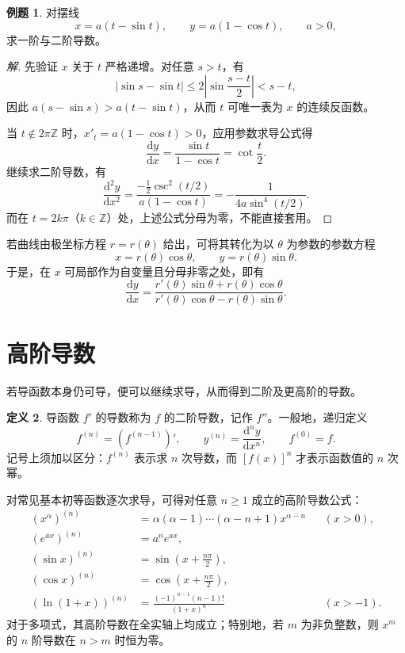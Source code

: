 \documentclass[UTF8,fontset=fandol,a4paper,12pt]{ctexart}
\newcommand{\dd}{\mathrm d}
\theoremstyle{definition}
\newtheorem{definition}{定义}[section]
\newtheorem{example}[definition]{例题}
\begin{document}
\begin{example}
对摆线
\[
 x=a(t-\sin t),\qquad y=a(1-\cos t),\qquad a>0,
\]
求一阶与二阶导数。
\end{example}
\begin{proof}[解]
先验证 $x$ 关于 $t$ 严格递增。对任意 $s>t$，有
\[
 |\sin s-\sin t|\le2\left|\sin\frac{s-t}{2}\right|<s-t,
\]
因此 $a(s-\sin s)>a(t-\sin t)$，从而 $t$ 可唯一表为 $x$ 的连续反函数。

当 $t\notin2\pi\mathbb Z$ 时，$x'_t=a(1-\cos t)>0$，应用参数求导公式得
\[
 \frac{\dd y}{\dd x}=\frac{\sin t}{1-\cos t}=\cot\frac t2.
\]
继续求二阶导数，有
\[
 \frac{\dd^2y}{\dd x^2}
 =\frac{-\frac12\csc^2(t/2)}{a(1-\cos t)}
 =-\frac1{4a\sin^4(t/2)}.
\]
而在 $t=2k\pi$（$k\in\mathbb Z$）处，上述公式分母为零，不能直接套用。
\end{proof}

若曲线由极坐标方程 $r=r(\theta)$ 给出，可将其转化为以 $\theta$ 为参数的参数方程
\[
 x=r(\theta)\cos\theta,\qquad y=r(\theta)\sin\theta.
\]
于是，在 $x$ 可局部作为自变量且分母非零之处，即有
\[
 \frac{\dd y}{\dd x}
 =\frac{r'(\theta)\sin\theta+r(\theta)\cos\theta}
 {r'(\theta)\cos\theta-r(\theta)\sin\theta}.
\]

\section{高阶导数}
若导函数本身仍可导，便可以继续求导，从而得到二阶及更高阶的导数。

\begin{definition}
导函数 $f'$ 的导数称为 $f$ 的二阶导数，记作 $f''$。一般地，递归定义
\[
 f^{(n)}=(f^{(n-1)})',\qquad
 y^{(n)}=\frac{\dd^ny}{\dd x^n},\qquad f^{(0)}=f.
\]
记号上须加以区分：$f^{(n)}$ 表示求 $n$ 次导数，而 $[f(x)]^n$ 才表示函数值的 $n$ 次幂。
\end{definition}

对常见基本初等函数逐次求导，可得对任意 $n\ge1$ 成立的高阶导数公式：
\begin{align*}
 (x^\alpha)^{(n)}&=\alpha(\alpha-1)\cdots(\alpha-n+1)x^{\alpha-n}
 &&(x>0),\\
 (e^{ax})^{(n)}&=a^ne^{ax},\\
 (\sin x)^{(n)}&=\sin\left(x+\frac{n\pi}2\right),\\
 (\cos x)^{(n)}&=\cos\left(x+\frac{n\pi}2\right),\\
 (\ln(1+x))^{(n)}&=\frac{(-1)^{n-1}(n-1)!}{(1+x)^n}
 &&(x>-1).
\end{align*}
对于多项式，其高阶导数在全实轴上均成立；特别地，若 $m$ 为非负整数，则 $x^m$ 的 $n$ 阶导数在 $n>m$ 时恒为零。
\end{document}
